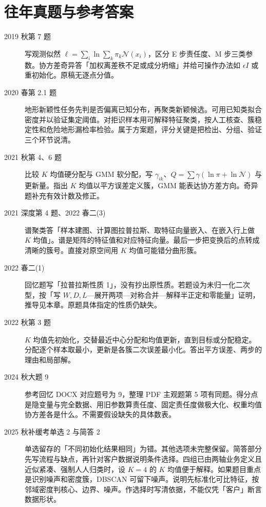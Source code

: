 \documentclass[UTF8,a4paper,zihao=-4,fontset=fandol]{ctexrep}
\begin{document}
\section{往年真题与参考答案}
\begin{description}
\item[2019 秋第 7 题] 写观测似然 $\ell=\sum_i\ln\sum_k\pi_k\mathcal N(x_i)$，区分 E 步责任度、M 步三类参数。协方差奇异答「加权离差秩不足或成分坍缩」并给可操作办法如 $\epsilon I$ 或重初始化。原稿无逐点分值。
\item[2020 春第 2.1 题] 地形新颖性任务先判是否偏离已知分布，再聚类新颖候选。可用已知类拟合密度并以验证集定阈值。对拒识样本用可解释特征聚类，按人工核查、簇稳定性和危险地形漏检率检验。属于方案题，评分关键是把检出、分组、验证三个环节说清。
\item[2021 秋第 4、6 题] 比较 $K$ 均值硬分配与 GMM 软分配，写 $\gamma_{ik}$、$Q=\sum\gamma(\ln\pi+\ln\mathcal N)$ 与更新量。指出 $K$ 均值以平方误差定义簇，GMM 能表达协方差方向。奇异题补充有效计数及修正。
\item[2021 深度第 4 题、2022 春二(3)] 谱聚类答「样本建图、计算图拉普拉斯、取特征向量嵌入、在嵌入行上做 $K$ 均值」。谱是矩阵的特征值和对应特征向量。最后一步把变换后的点转成清晰的簇号。直接对原空间用 $K$ 均值可能错分曲形簇。
\item[2022 春二(1)] 回忆题写「拉普拉斯性质 1」，没有抄出原性质。若题设为未归一化二次型，按「写 $W,D,L$—展开两项—对称合并—解释半正定和零能量」证明，推导见本章。原题具体指定的性质仍缺失。
\item[2022 秋第 3 题] $K$ 均值先初始化，交替最近中心分配和均值更新，直到目标或分配稳定。分配逐个样本取最小，更新是各簇二次误差最小化。答出平方误差、两步的理由和局部解。
\item[2024 秋大题 9] 参考回忆 DOCX 对应题号为 9，整理 PDF 主观题第 5 项有同题。得分点是隐变量与完全数据、用旧参数算责任度、固定责任度做极大化、权重均值协方差各是什么。不需要假设缺失的具体数表。
\item[2025 秋补缓考单选 2 与简答 2] 单选留存的「不同初始化结果相同」为错。其他选项未完整保留。简答部分先写流程与缺点，再针对客户数据说明条件选择。四组已由两轴业务定义且近似紧凑、强制人人归类时，设 $K=4$ 的 $K$ 均值便于解释。如果题目重点是识别噪声和密度簇，DBSCAN 可留下噪声。说明先标准化可比特征，按邻域密度判核心、边界、噪声。作选择时写清依据，不能仅凭「客户」断言数据形状。
\end{description}
\end{document}
